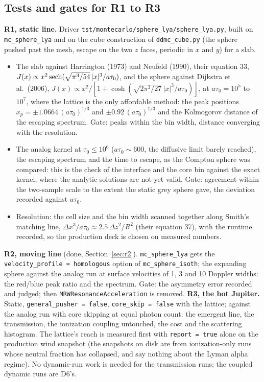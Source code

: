 \documentclass[11pt]{article}
\newcommand{\key}[1]{\texttt{#1}}
\begin{document}
\subsection{Tests and gates for R1 to R3}

\textbf{R1, static line.}  Driver \texttt{tst/montecarlo/sphere\_lya/sphere\_lya.py},
built on \texttt{mc\_sphere\_lya} and on the cube construction of
\texttt{ddmc\_cube.py} (the sphere pushed past the mesh, escape on the two $z$ faces,
periodic in $x$ and $y$) for a slab.
\begin{itemize}
\item The slab against Harrington (1973) and Neufeld (1990), their equation 33,
  $J(x) \propto x^2\,{\rm sech}(\sqrt{\pi^3/54}\,|x|^3/a\tau_0)$, and the sphere
  against Dijkstra et al.\ (2006), $J(x) \propto x^2/[1 + \cosh(\sqrt{2\pi^3/27}\,
  |x|^3/a\tau_0)]$, at $a\tau_0 = 10^5$ to $10^7$, where the lattice is the only
  affordable method: the peak positions $x_p = \pm1.0664\,(a\tau_0)^{1/3}$ and
  $\pm0.92\,(a\tau_0)^{1/3}$ and the Kolmogorov distance of the escaping spectrum.
  Gate: peaks within the bin width, distance converging with the resolution.
\item The analog kernel at $\tau_0 \le 10^6$ ($a\tau_0 \sim 600$, the diffusive
  limit barely reached), the escaping spectrum and the time to escape, as the
  Compton sphere was compared: this is the check of the interface and the core bin
  against the exact kernel, where the analytic solutions are not yet valid.  Gate:
  agreement within the two-sample scale to the extent the static grey sphere gave,
  the deviation recorded against $a\tau_0$.
\item Resolution: the cell size and the bin width scanned together along Smith's
  matching line, $\Delta x^3/a\tau_0 \approx 2.5\,\Delta z^2/R^2$ (their equation 37),
  with the runtime recorded, so the production deck is chosen on measured numbers.
\end{itemize}
\textbf{R2, moving line} (done, Section~\ref{sec:r2}).  \texttt{mc\_sphere\_lya} gets the \key{velocity\_profile =
homologous} option of \texttt{mc\_sphere\_isoth}; the expanding sphere against the analog
run at surface velocities of 1, 3 and 10 Doppler widths: the red/blue peak ratio and
the spectrum.  Gate: the asymmetry error recorded and judged; then
\texttt{MRWResonanceAcceleration} is removed.
\textbf{R3, the hot Jupiter.}  Static, \texttt{general\_pusher = false}, \key{core\_skip
= false} with the lattice; against the analog run with core skipping at equal photon
count: the emergent line, the transmission, the ionization coupling untouched, the
cost and the scattering histogram.  The lattice's reach is measured first with
\key{report = true} alone on the production wind snapshot (the snapshots on disk are
from ionization-only runs whose neutral fraction has collapsed, and say nothing about
the Lyman alpha regime).  No dynamic-run work is needed for the transmission runs;
the coupled dynamic runs are D6's.
\end{document}
